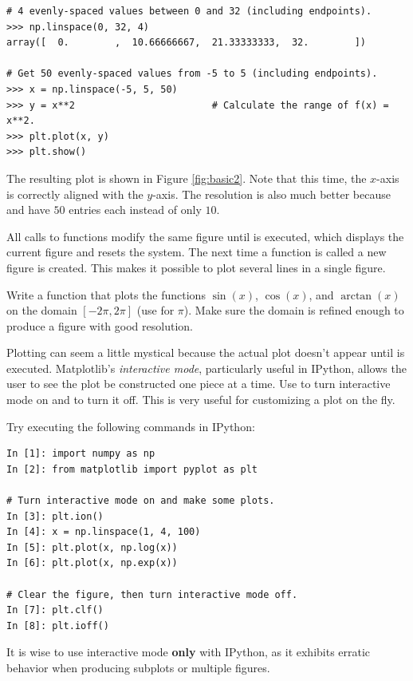 \begin{lstlisting}
# 4 evenly-spaced values between 0 and 32 (including endpoints).
>>> np.linspace(0, 32, 4)
array([  0.        ,  10.66666667,  21.33333333,  32.        ])

# Get 50 evenly-spaced values from -5 to 5 (including endpoints).
>>> x = np.linspace(-5, 5, 50)
>>> y = x**2                        # Calculate the range of f(x) = x**2.
>>> plt.plot(x, y)
>>> plt.show()
\end{lstlisting}

The resulting plot is shown in Figure \ref{fig:basic2}.
Note that this time, the $x$-axis is correctly aligned with the $y$-axis.
The resolution is also much better because  and  have $50$ entries each instead of only $10$.

All calls to  functions modify the same figure until  is executed, which displays the current figure and resets the system.
The next time a  function is called a new figure is created.
This makes it possible to plot several lines in a single figure.

\begin{problem} %
Write a function that plots the functions $\sin(x)$, $\cos(x)$, and $\arctan(x)$ on the domain $[-2\pi, 2\pi]$ (use  for $\pi$).
Make sure the domain is refined enough to produce a figure with good resolution.
\end{problem}

\begin{info} %
Plotting can seem a little mystical because the actual plot doesn't appear until  is executed.
Matplotlib's \emph{interactive mode}, particularly useful in IPython, allows the user to see the plot be constructed one piece at a time.
Use  to turn interactive mode on and  to turn it off.
This is very useful for customizing a plot on the fly.

Try executing the following commands in IPython:

\begin{lstlisting}
In [1]: import numpy as np
In [2]: from matplotlib import pyplot as plt

# Turn interactive mode on and make some plots.
In [3]: plt.ion()
In [4]: x = np.linspace(1, 4, 100)
In [5]: plt.plot(x, np.log(x))
In [6]: plt.plot(x, np.exp(x))

# Clear the figure, then turn interactive mode off.
In [7]: plt.clf()
In [8]: plt.ioff()
\end{lstlisting}

It is wise to use interactive mode \textbf{only} with IPython, as it exhibits erratic behavior when producing subplots or multiple figures.
\end{info}

